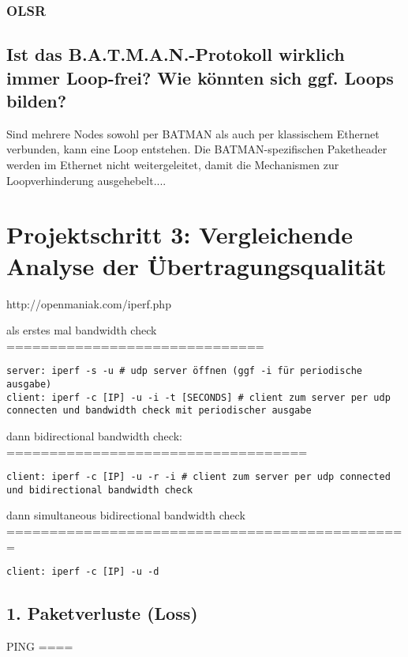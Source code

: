 \documentclass[a4paper,10pt]{article}
\begin{document}

\subsubsection*{OLSR}

\subsection{Ist das B.A.T.M.A.N.-Protokoll wirklich immer Loop-frei? Wie könnten sich ggf. Loops bilden?}
Sind mehrere Nodes sowohl per BATMAN als auch per klassischem Ethernet verbunden, kann eine Loop entstehen. Die BATMAN-spezifischen Paketheader werden im Ethernet nicht weitergeleitet, damit die Mechanismen zur Loopverhinderung ausgehebelt....

\section{Projektschritt 3: Vergleichende Analyse der Übertragungsqualität}

http://openmaniak.com/iperf.php

als erstes mal bandwidth check
==============================

\begin{lstlisting}
server: iperf -s -u # udp server öffnen (ggf -i für periodische ausgabe)
client: iperf -c [IP] -u -i -t [SECONDS] # client zum server per udp connecten und bandwidth check mit periodischer ausgabe
\end{lstlisting}


dann bidirectional bandwidth check:
===================================

\begin{lstlisting}
client: iperf -c [IP] -u -r -i # client zum server per udp connected und bidirectional bandwidth check
\end{lstlisting}

dann simultaneous bidirectional bandwidth check
===============================================

\begin{lstlisting}
client: iperf -c [IP] -u -d
\end{lstlisting}

\subsection{1. Paketverluste (Loss)}

PING
====
\end{document}
